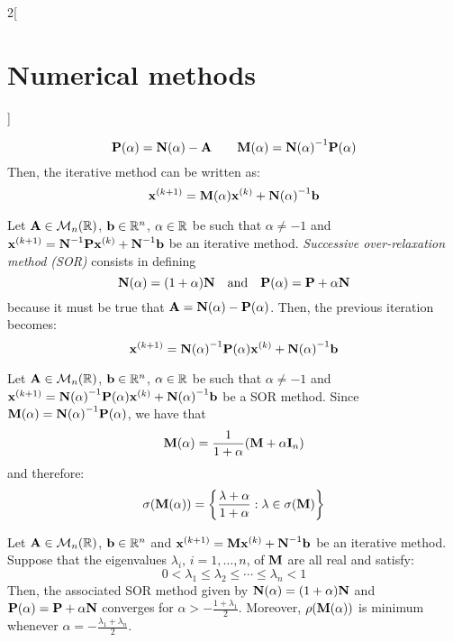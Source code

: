 \documentclass[../../../main.tex]{subfiles}
\begin{document}
\begin{multicols}{2}[\section{Numerical methods}]
\begin{method}
    $$\boldsymbol{\mathrm{P}}(\alpha)=\boldsymbol{\mathrm{N}}(\alpha)-\boldsymbol{\mathrm{A}}\qquad\boldsymbol{\mathrm{M}}(\alpha)={\boldsymbol{\mathrm{N}}(\alpha)}^{-1}\boldsymbol{\mathrm{P}}(\alpha)$$
    Then, the iterative method can be written as: $$\boldsymbol{\mathrm{x}}^{(k+1)}=\boldsymbol{\mathrm{M}}(\alpha)\boldsymbol{\mathrm{x}}^{(k)}+{\boldsymbol{\mathrm{N}}(\alpha)}^{-1}\boldsymbol{\mathrm{b}}$$
  \end{method}
  \begin{method}
    Let $\boldsymbol{\mathrm{A}}\in\mathcal{M}_n(\mathbb{R})$, $\boldsymbol{\mathrm{b}}\in\mathbb{R}^n$, $\alpha\in\mathbb{R}$ be such that $\alpha\ne-1$ and $\boldsymbol{\mathrm{x}}^{(k+1)}=\boldsymbol{\mathrm{N}}^{-1}\boldsymbol{\mathrm{P}}\boldsymbol{\mathrm{x}}^{(k)}+\boldsymbol{\mathrm{N}}^{-1}\boldsymbol{\mathrm{b}}$ be an iterative method. \textit{Successive over-relaxation method (SOR)} consists in defining $$\boldsymbol{\mathrm{N}}(\alpha)=(1+\alpha)\boldsymbol{\mathrm{N}}\quad\text{and}\quad\boldsymbol{\mathrm{P}}(\alpha)=\boldsymbol{\mathrm{P}}+\alpha\boldsymbol{\mathrm{N}}$$ because it must be true that $\boldsymbol{\mathrm{A}}=\boldsymbol{\mathrm{N}}(\alpha)-\boldsymbol{\mathrm{P}}(\alpha)$. Then, the previous iteration becomes: $$\boldsymbol{\mathrm{x}}^{(k+1)}={\boldsymbol{\mathrm{N}}(\alpha)}^{-1}\boldsymbol{\mathrm{P}}(\alpha)\boldsymbol{\mathrm{x}}^{(k)}+{\boldsymbol{\mathrm{N}}(\alpha)}^{-1}\boldsymbol{\mathrm{b}}$$
  \end{method}
  \begin{definition}
    Let $\boldsymbol{\mathrm{A}}\in\mathcal{M}_n(\mathbb{R})$, $\boldsymbol{\mathrm{b}}\in\mathbb{R}^n$, $\alpha\in\mathbb{R}$ be such that $\alpha\ne-1$ and $\boldsymbol{\mathrm{x}}^{(k+1)}={\boldsymbol{\mathrm{N}}(\alpha)}^{-1}\boldsymbol{\mathrm{P}}(\alpha)\boldsymbol{\mathrm{x}}^{(k)}+{\boldsymbol{\mathrm{N}}(\alpha)}^{-1}\boldsymbol{\mathrm{b}}$ be a SOR method. Since $\boldsymbol{\mathrm{M}}(\alpha)={\boldsymbol{\mathrm{N}}(\alpha)}^{-1}\boldsymbol{\mathrm{P}}(\alpha)$, we have that $$\boldsymbol{\mathrm{M}}(\alpha)=\frac{1}{1+\alpha}(\boldsymbol{\mathrm{M}}+\alpha\boldsymbol{\mathrm{I}}_n)$$ and therefore: $$\sigma(\boldsymbol{\mathrm{M}}(\alpha))=\left\{\frac{\lambda+\alpha}{1+\alpha}:\lambda\in\sigma(\boldsymbol{\mathrm{M}})\right\}$$
  \end{definition}
  \begin{theorem}
    Let $\boldsymbol{\mathrm{A}}\in\mathcal{M}_n(\mathbb{R})$, $\boldsymbol{\mathrm{b}}\in\mathbb{R}^n$ and $\boldsymbol{\mathrm{x}}^{(k+1)}=\boldsymbol{\mathrm{M}}\boldsymbol{\mathrm{x}}^{(k)}+\boldsymbol{\mathrm{N}}^{-1}\boldsymbol{\mathrm{b}}$ be an iterative method. Suppose that the eigenvalues $\lambda_i$, $i=1,\ldots,n$, of $\boldsymbol{\mathrm{M}}$ are all real and satisfy: $$0<\lambda_1\leq\lambda_2\leq\cdots\leq\lambda_n<1$$
    Then, the associated SOR method given by $\boldsymbol{\mathrm{N}}(\alpha)=(1+\alpha)\boldsymbol{\mathrm{N}}$ and $\boldsymbol{\mathrm{P}}(\alpha)=\boldsymbol{\mathrm{P}}+\alpha\boldsymbol{\mathrm{N}}$ converges for $\alpha>-\frac{1+\lambda_1}{2}$. Moreover, $\rho(\boldsymbol{\mathrm{M}}(\alpha))$ is minimum whenever $\alpha=-\frac{\lambda_1+\lambda_n}{2}$.
  \end{theorem}

\end{multicols}
\end{document}
